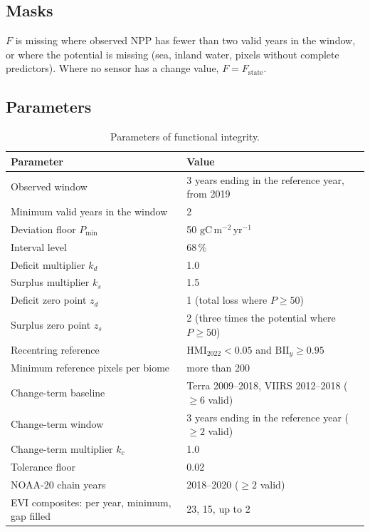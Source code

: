 \documentclass[11pt,a4paper]{article}
\newcommand{\npp}{\ensuremath{\mathrm{gC\,m^{-2}\,yr^{-1}}}}
\newcommand{\HMI}{\mathrm{HMI}}
\newcommand{\BII}{\mathrm{BII}}
\begin{document}
\subsection{Masks}

$F$ is missing where observed NPP has fewer than two valid years in the window, or where the
potential is missing (sea, inland water, pixels without complete predictors). Where no sensor has
a change value, $F = F_{\text{state}}$.

\subsection{Parameters}

\begin{table}[H]
\centering\small
\caption{Parameters of functional integrity.}
\begin{tabular}{ll}
\toprule
Parameter & Value \\
\midrule
Observed window & 3 years ending in the reference year, from 2019 \\
Minimum valid years in the window & 2 \\
Deviation floor $P_{\min}$ & 50 \npp \\
Interval level & 68\,\% \\
Deficit multiplier $k_d$ & 1.0 \\
Surplus multiplier $k_s$ & 1.5 \\
Deficit zero point $z_d$ & 1 (total loss where $P \ge 50$) \\
Surplus zero point $z_s$ & 2 (three times the potential where $P \ge 50$) \\
Recentring reference & $\HMI_{2022} < 0.05$ and $\BII_y \ge 0.95$ \\
Minimum reference pixels per biome & more than 200 \\
Change-term baseline & Terra 2009--2018, VIIRS 2012--2018 ($\ge 6$ valid) \\
Change-term window & 3 years ending in the reference year ($\ge 2$ valid) \\
Change-term multiplier $k_c$ & 1.0 \\
Tolerance floor & 0.02 \\
NOAA-20 chain years & 2018--2020 ($\ge 2$ valid) \\
EVI composites: per year, minimum, gap filled & 23, 15, up to 2 \\
\bottomrule
\end{tabular}
\end{table}
\end{document}
